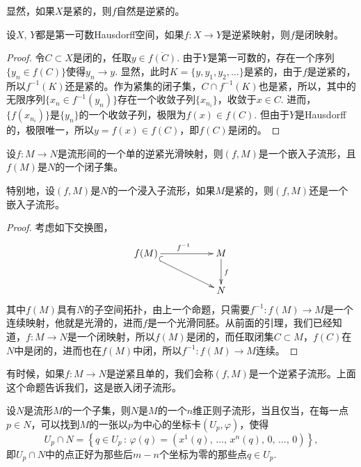 显然，如果$X$是紧的，则$f$自然是逆紧的。

\begin{lem}
设$X$, $Y$都是第一可数Hausdorff空间，如果$f:X\to Y$是逆紧映射，则$f$是闭映射。
\end{lem}

\begin{proof}
	令$C\subset X$是闭的，任取$y\in \overline{f(C)}$. 由于$Y$是第一可数的，存在一个序列$\{y_n\in f(C)\}$使得$y_n\to y$. 显然，此时$K=\{y,y_1,y_2,\dots\}$是紧的，由于$f$是逆紧的，所以$f^{-1}(K)$还是紧的。作为紧集的闭子集，$C\cap f^{-1}(K)$也是紧，所以，其中的无限序列$\{x_n\in f^{-1}(y_n)\}$存在一个收敛子列$\{x_{n_i}\}$，收敛于$x\in C$. 进而，$\{f(x_{n_i})\}$是$\{y_n\}$的一个收敛子列，极限为$f(x)\in f(C)$. 但由于$Y$是Hausdorff的，极限唯一，所以$y=f(x)\in f(C)$，即$f(C)$是闭的。
\end{proof}

\begin{pro}
设$f:M\to N$是流形间的一个单的逆紧光滑映射，则$(f,M)$是一个嵌入子流形，且$f(M)$是$N$的一个闭子集。
\end{pro}

特别地，设$(f,M)$是$N$的一个浸入子流形，如果$M$是紧的，则$(f,M)$还是一个嵌入子流形。

\begin{proof}
	考虑如下交换图，
	\[
	\begin{xy}
		\xymatrix{
			f(M)\ar@{^{(}->}[rrd]\ar[rr]^{f^{-1}}&&M\ar[d]^f\\
			&&N
		}
	\end{xy}
	\]
	其中$f(M)$具有$N$的子空间拓扑，由上一个命题，只需要$f^{-1}:f(M)\to M$是一个连续映射，他就是光滑的，进而$f$是一个光滑同胚。从前面的引理，我们已经知道，$f:M\to N$是一个闭映射，所以$f(M)$是闭的，而任取闭集$C\subset M$，$f(C)$在$N$中是闭的，进而也在$f(M)$中闭，所以$f^{-1}:f(M)\to M$连续。
\end{proof}

有时候，如果$f:M\to N$是逆紧且单的，我们会称$(f,M)$是一个逆紧子流形。上面这个命题告诉我们，这是嵌入闭子流形。

\begin{thm}[正则子流形的结构定理]
设$N$是流形$M$的一个子集，则$N$是$M$的一个$n$维正则子流形，当且仅当，在每一点$p\in N$，可以找到$M$的一张以$p$为中心的坐标卡$(U_p,\varphi)$，使得
\[
	U_p\cap N=\left\{q\in U_p\,:\,\varphi(q)=\left(x^1(q)\text{, $\dots$, }x^n(q)\text{, }0\text{, $\dots$, }0\right)\right\},
\]
即$U_p\cap N$中的点正好为那些后$m-n$个坐标为零的那些点$q\in U_p$. 
\end{thm}

